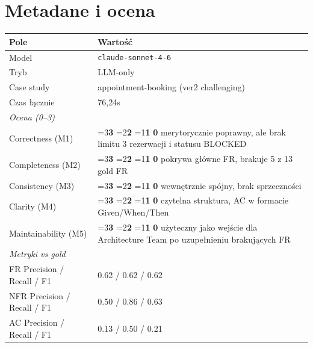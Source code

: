\documentclass[12pt,a4paper]{article}
\newcommand{\scorebox}[1]{%
  \ifnum#1=3\colorbox{score3}{\textbf{3}}%
  \else\ifnum#1=2\colorbox{score2}{\textbf{2}}%
  \else\ifnum#1=1\colorbox{score1}{\textbf{1}}%
  \else\colorbox{score0}{\textbf{0}}\fi\fi\fi
}
\begin{document}
\section{Metadane i ocena}
\begin{table}[h]
\begin{tabularx}{\textwidth}{l X}
\toprule
\textbf{Pole} & \textbf{Wartość} \\
\midrule
Model & \texttt{claude-sonnet-4-6} \\
Tryb & LLM-only \\
Case study & appointment-booking (ver2 challenging) \\
Czas łącznie & 76,24s \\
\midrule
\multicolumn{2}{l}{\textit{Ocena (0--3)}} \\
\midrule
Correctness (M1)     & \scorebox{2} \quad merytorycznie poprawny, ale brak limitu 3 rezerwacji i statusu BLOCKED \\
Completeness (M2)    & \scorebox{2} \quad pokrywa główne FR, brakuje 5 z 13 gold FR \\
Consistency (M3)     & \scorebox{3} \quad wewnętrznie spójny, brak sprzeczności \\
Clarity (M4)         & \scorebox{3} \quad czytelna struktura, AC w formacie Given/When/Then \\
Maintainability (M5) & \scorebox{2} \quad użyteczny jako wejście dla Architecture Team po uzupełnieniu brakujących FR \\
\midrule
\multicolumn{2}{l}{\textit{Metryki vs gold}} \\
\midrule
FR Precision / Recall / F1   & 0.62 / 0.62 / 0.62 \\
NFR Precision / Recall / F1  & 0.50 / 0.86 / 0.63 \\
AC Precision / Recall / F1   & 0.13 / 0.50 / 0.21 \\
\bottomrule
\end{tabularx}
\end{table}
\end{document}
